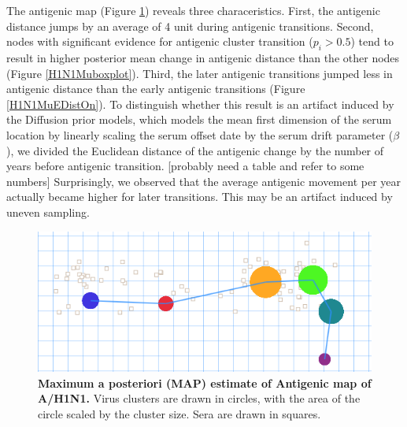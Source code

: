 \documentclass[11pt,oneside,letterpaper]{article}
\begin{document}
The antigenic map (Figure \ref{H1N1antigenicMap}) reveals three characeristics.
First, the antigenic distance jumps by an average of 4 unit during antigenic transitions. 
Second, nodes with significant evidence for antigenic cluster transition ($p_i > 0.5$) tend to result in higher posterior mean change in antigenic distance than the other nodes (Figure \ref{H1N1Muboxplot}).
Third, the later antigenic transitions jumped less in antigenic distance than the early antigenic transitions (Figure \ref{H1N1MuEDistOn}). 
To distinguish whether this result is an artifact induced by the Diffusion prior models, which models the mean first dimension of the serum location by linearly scaling the serum offset date by the serum drift parameter ($\beta$), we divided the Euclidean distance of the antigenic change by the number of years before antigenic transition. [probably need a table and refer to some numbers]
Surprisingly, we observed that the average antigenic movement per year actually became higher for later transitions. 
This may be an artifact induced by uneven sampling.







\begin{figure}[h]
	\centering		
	\includegraphics[width=1\textwidth]{figures/custom/H1N1Euclid}
	\caption{\textbf{Maximum a posteriori (MAP) estimate of Antigenic map of A/H1N1.} %
 Virus clusters are drawn in circles, with the area of the circle scaled by the cluster size. Sera are drawn in squares.
	 		} 
	\label{H1N1antigenicMap} 
\end{figure}
\end{document}

